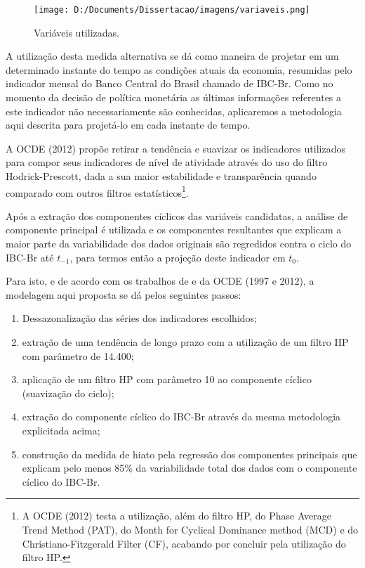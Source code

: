 \documentclass[
	article,			%
	11pt,				%
	oneside,			%
	a4paper,			%
	english,			%
	brazil,				%
	]{abntex2}
\begin{document}
	\hfill \break
	\hfill \break
	\hfill \break
	\hfill \break
	\hfill \break
	\hfill \break
	\hfill \break
	\hfill \break
	\hfill \break
	\hfill \break
	\hfill \break
	\hfill \break
	\hfill \break
	\hfill \break
	\hfill \break
	\hfill \break
	\hfill \break
	\hfill \break
	\hfill \break
	\hfill \break
	\hfill \break
	
	\begin{figure}[!h]
	\texttt{[image: D:/Documents/Dissertacao/imagens/variaveis.png]}
	\caption{Variáveis utilizadas.}
	\label{fig:variaveis}
	\end{figure}
	
	A utilização desta medida alternativa se dá como maneira de projetar em um determinado instante do tempo as condições atuais da economia, resumidas pelo indicador mensal do Banco Central do Brasil chamado de IBC-Br. Como no momento da decisão de política monetária as últimas informações referentes a este indicador não necessariamente são conhecidas, aplicaremos a metodologia aqui descrita para projetá-lo em cada instante de tempo.
	
	A OCDE (2012) propõe retirar a tendência e suavizar os indicadores utilizados para compor seus indicadores de nível de atividade através do uso do filtro Hodrick-Prescott, dada a sua maior estabilidade e transparência quando comparado com outros filtros estatísticos\footnote{A OCDE (2012) testa a utilização, além do filtro HP, do Phase Average Trend Method (PAT), do Month for Cyclical Dominance method (MCD) e do Christiano-Fitzgerald Filter (CF), acabando por concluir pela utilização do filtro HP.}.
	
	Após a extração dos componentes cíclicos das variáveis candidatas, a análise de componente principal é utilizada e os componentes resultantes que explicam a maior parte da variabilidade dos dados originais são regredidos contra o ciclo do IBC-Br até $t_{-1}$, para termos então a projeção deste indicador em $t_0$.
	
	Para isto, e de acordo com os trabalhos de  e da OCDE (1997 e 2012), a modelagem aqui proposta se dá pelos seguintes passos:
	
	\begin{enumerate}
		\item Dessazonalização das séries dos indicadores escolhidos;
		\item extração de uma tendência de longo prazo com a utilização de um filtro HP com parâmetro de 14.400;
		\item aplicação de um filtro HP com parâmetro 10 ao componente cíclico (suavização do ciclo);
		\item extração do componente cíclico do IBC-Br através da mesma metodologia explicitada acima;
		\item construção da medida de hiato pela regressão dos componentes principais que explicam pelo menos 85\% da variabilidade total dos dados com o componente cíclico do IBC-Br.
	\end{enumerate}
	
\end{document}
